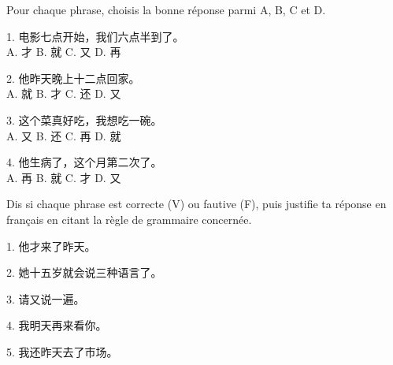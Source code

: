 \documentclass[11pt]{article}
\begin{document}
\begin{exercice}
Pour chaque phrase, choisis la bonne réponse parmi A, B, C et D.

1. 电影七点开始，我们六点半\underline{\hspace{1.5cm}}到了。\\
A. 才 \hspace{0.8cm} B. 就 \hspace{0.8cm} C. 又 \hspace{0.8cm} D. 再

2. 他昨天晚上十二点\underline{\hspace{1.5cm}}回家。\\
A. 就 \hspace{0.8cm} B. 才 \hspace{0.8cm} C. 还 \hspace{0.8cm} D. 又

3. 这个菜真好吃，我想\underline{\hspace{1.5cm}}吃一碗。\\
A. 又 \hspace{0.8cm} B. 还 \hspace{0.8cm} C. 再 \hspace{0.8cm} D. 就

4. 他\underline{\hspace{1.5cm}}生病了，这个月第二次了。\\
A. 再 \hspace{0.8cm} B. 就 \hspace{0.8cm} C. 才 \hspace{0.8cm} D. 又
\end{exercice}

\begin{exercice}
Dis si chaque phrase est correcte (V) ou fautive (F), puis justifie ta réponse en français en citant la règle de grammaire concernée.

1. 他才来了昨天。

2. 她十五岁就会说三种语言了。

3. 请又说一遍。

4. 我明天再来看你。

5. 我还昨天去了市场。
\end{exercice}
\end{document}
